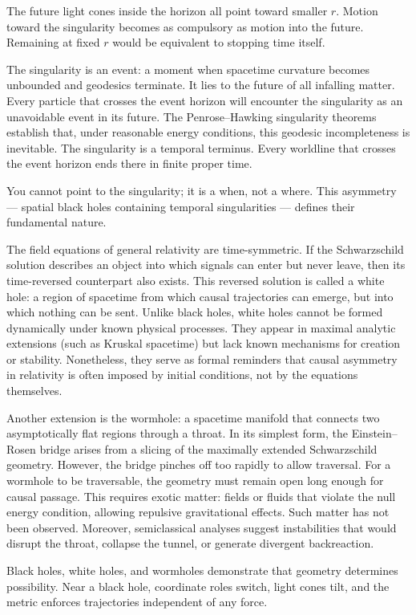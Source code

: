 The future light cones inside the horizon all point toward smaller $r$. Motion toward the singularity becomes as compulsory as motion into the future. Remaining at fixed $r$ would be equivalent to stopping time itself.

The singularity is an event: a moment when spacetime curvature becomes unbounded and geodesics terminate. It lies to the future of all infalling matter. Every particle that crosses the event horizon will encounter the singularity as an unavoidable event in its future. The Penrose–Hawking singularity theorems establish that, under reasonable energy conditions, this geodesic incompleteness is inevitable. The singularity is a temporal terminus. Every worldline that crosses the event horizon ends there in finite proper time.

You cannot point to the singularity; it is a when, not a where. This asymmetry — spatial black holes containing temporal singularities — defines their fundamental nature.

The field equations of general relativity are time-symmetric. If the Schwarzschild solution describes an object into which signals can enter but never leave, then its time-reversed counterpart also exists. This reversed solution is called a white hole: a region of spacetime from which causal trajectories can emerge, but into which nothing can be sent. Unlike black holes, white holes cannot be formed dynamically under known physical processes. They appear in maximal analytic extensions (such as Kruskal spacetime) but lack known mechanisms for creation or stability. Nonetheless, they serve as formal reminders that causal asymmetry in relativity is often imposed by initial conditions, not by the equations themselves.

Another extension is the wormhole: a spacetime manifold that connects two asymptotically flat regions through a throat. In its simplest form, the Einstein–Rosen bridge arises from a slicing of the maximally extended Schwarzschild geometry. However, the bridge pinches off too rapidly to allow traversal. For a wormhole to be traversable, the geometry must remain open long enough for causal passage. This requires exotic matter: fields or fluids that violate the null energy condition, allowing repulsive gravitational effects. Such matter has not been observed. Moreover, semiclassical analyses suggest instabilities that would disrupt the throat, collapse the tunnel, or generate divergent backreaction.

Black holes, white holes, and wormholes demonstrate that geometry determines possibility. Near a black hole, coordinate roles switch, light cones tilt, and the metric enforces trajectories independent of any force.

